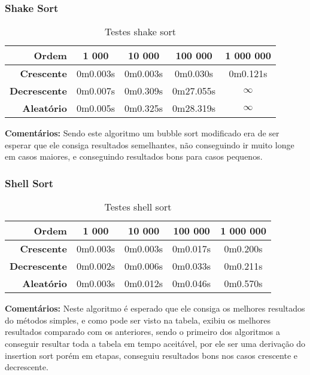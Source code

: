 \documentclass[
	12pt,				%
	oneside,			%
	a4paper,			%
	english,			%
	brazil,				%
	]{article}
\begin{document}
\subsubsection{Shake Sort}
\begin{table}[H]
\centering
\begin{tabular}{|r|c|c|c|c|}
\cline{1-5} 
\textbf{Ordem} & \textbf{1 000} & \textbf{10 000} & \textbf{100 000} & \textbf{1 000 000}\\
 \hline
 \textbf{Crescente} & 0m0.003s & 0m0.003s & 0m0.030s & 0m0.121s \\
 \hline
 \textbf{Decrescente} & 	0m0.007s & 0m0.309s & 0m27.055s & $\infty$ \\
 \hline
 \textbf{Aleat{\'o}rio} & 0m0.005s & 0m0.325s & 0m28.319s & $\infty$ \\
 \hline
\end{tabular} 
\caption{Testes shake sort}
\end{table}
\indent \textbf{Comentários:} Sendo este algoritmo um bubble sort modificado era de ser esperar que ele consiga resultados semelhantes, não conseguindo ir muito longe em casos
maiores, e conseguindo resultados bons para casos pequenos.


\subsubsection{Shell Sort}
\begin{table}[H]
\centering
\begin{tabular}{|r|c|c|c|c|}
\cline{1-5} 
 \textbf{Ordem} & \textbf{1 000} & \textbf{10 000} & \textbf{100 000} & \textbf{1 000 000}\\
 \hline
 \textbf{Crescente} & 0m0.003s & 0m0.003s & 0m0.017s & 0m0.200s \\
 \hline
 \textbf{Decrescente} & 0m0.002s & 0m0.006s & 0m0.033s & 0m0.211s \\
 \hline
 \textbf{Aleat{\'o}rio} & 0m0.003s & 0m0.012s & 0m0.046s & 0m0.570s \\
 \hline
\end{tabular} 
\caption{Testes shell sort}
\end{table}
\indent \textbf{Comentários:} Neste algoritmo é esperado que ele consiga os melhores resultados do métodos simples, e como pode ser visto na tabela, exibiu os melhores
resultados comparado com os anteriores, sendo o primeiro dos algoritmos a conseguir resultar toda a tabela em tempo aceitável, por ele ser uma derivação do insertion sort
porém em etapas, conseguiu resultados bons nos casos crescente e decrescente.
\end{document}
